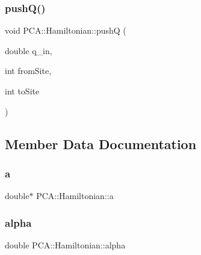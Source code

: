 \hypertarget{class_p_c_a_1_1_hamiltonian_acc90d71bea33d377b93db657f4444d93}{}\label{class_p_c_a_1_1_hamiltonian_acc90d71bea33d377b93db657f4444d93} 
\subsubsection{\texorpdfstring{push\+Q()}{pushQ()}}
{\footnotesize\ttfamily void P\+C\+A\+::\+Hamiltonian\+::pushQ (\begin{DoxyParamCaption}\item[{double}]{q\+\_\+in,  }\item[{int}]{from\+Site,  }\item[{int}]{to\+Site }\end{DoxyParamCaption})}



\subsection{Member Data Documentation}
\hypertarget{class_p_c_a_1_1_hamiltonian_aec8578a7d250be77a3e2eb84718815c7}{}\label{class_p_c_a_1_1_hamiltonian_aec8578a7d250be77a3e2eb84718815c7} 
\subsubsection{\texorpdfstring{a}{a}}
{\footnotesize\ttfamily double$\ast$ P\+C\+A\+::\+Hamiltonian\+::a\hspace{0.3cm}{\ttfamily [private]}}

\hypertarget{class_p_c_a_1_1_hamiltonian_a71a66a52512faafc9bc8594d96f02e5f}{}\label{class_p_c_a_1_1_hamiltonian_a71a66a52512faafc9bc8594d96f02e5f} 
\subsubsection{\texorpdfstring{alpha}{alpha}}
{\footnotesize\ttfamily double P\+C\+A\+::\+Hamiltonian\+::alpha\hspace{0.3cm}{\ttfamily [private]}}

\hypertarget{class_p_c_a_1_1_hamiltonian_ac3a46f259db252d1b3a4ddbf40422026}{}\label{class_p_c_a_1_1_hamiltonian_ac3a46f259db252d1b3a4ddbf40422026} 
